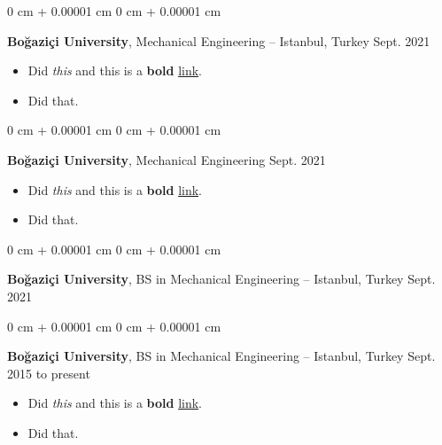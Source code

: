 \documentclass[10pt, letterpaper]{article}
\newenvironment{highlights}{
    \begin{itemize}[
        topsep=0.10 cm,
        parsep=0.10 cm,
        partopsep=0pt,
        itemsep=0pt,
        leftmargin=0 cm + 10pt
    ]
}{
    \end{itemize}
        
    \vspace{-0.20cm}
} %
\newenvironment{onecolentry}{
    \begin{adjustwidth}{
        0 cm + 0.00001 cm
    }{
        0 cm + 0.00001 cm
    }
}{
    \end{adjustwidth}
} %
\begin{document}
        \vspace{0.1 cm}

        \begin{onecolentry}
            \textbf{Boğaziçi University}, Mechanical Engineering -- Istanbul, Turkey \hfill Sept. 2021
            \begin{highlights}
                \item Did \textit{this} and this is a \textbf{bold} \href{https://example.com}{link}.
                \item Did that.
            \end{highlights}
        \end{onecolentry}

        \vspace{0.1 cm}

        \begin{onecolentry}
            \textbf{Boğaziçi University}, Mechanical Engineering \hfill Sept. 2021
            \begin{highlights}
                \item Did \textit{this} and this is a \textbf{bold} \href{https://example.com}{link}.
                \item Did that.
            \end{highlights}
        \end{onecolentry}

        \vspace{0.1 cm}

        \begin{onecolentry}
            \textbf{Boğaziçi University}, BS in Mechanical Engineering -- Istanbul, Turkey \hfill Sept. 2021
        \end{onecolentry}

        \vspace{0.1 cm}

        \begin{onecolentry}
            \textbf{Boğaziçi University}, BS in Mechanical Engineering -- Istanbul, Turkey \hfill Sept. 2015 to present
            \begin{highlights}
                \item Did \textit{this} and this is a \textbf{bold} \href{https://example.com}{link}.
                \item Did that.
            \end{highlights}
        \end{onecolentry}

        \vspace{0.1 cm}
\end{document}
